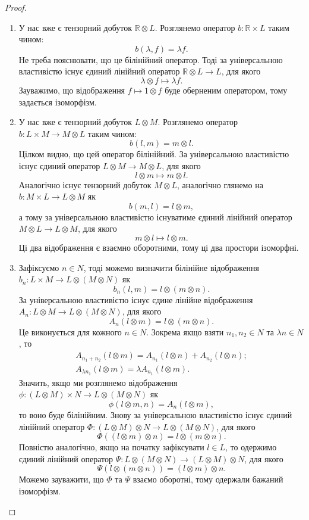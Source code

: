 \documentclass{math_library}
\begin{document}
\begin{proof}
\begin{enumerate}[topsep=0pt,label={\arabic*)},wide=0pt]
\item У нас вже є тензорний добуток $\mathbb{R} \otimes L$. Розглянемо оператор $b \colon \mathbb{R} \times L$ таким чином:
\[
b(\lambda,f) = \lambda f.
\]
Не треба пояснювати, що це білінійний оператор. Тоді за універсальною властивістю існує єдиний лінійний оператор $\mathbb{R} \otimes L \to L$, для якого
\[
\lambda \otimes f \mapsto \lambda f.
\]
Зауважимо, що відображення $f \mapsto 1 \otimes f$ буде оберненим оператором, тому задається ізоморфізм.

\item У нас вже є тензорний добуток $L \otimes M$. Розглянемо оператор $b \colon L \times M \to M \otimes L$ таким чином:
\[
b(l,m) = m \otimes l.
\]
Цілком видно, що цей оператор білінійний. За універсальною властивістю існує єдиний оператор $L \otimes M \to M \otimes L$, для якого
\[
l \otimes m \mapsto m \otimes l.
\]
Аналогічно існує тензорний добуток $M \otimes L$, аналогічно глянемо на $b \colon M \times L \to L \otimes M$ як
\[
b(m,l) = l \otimes m,
\]
а тому за універсальною властивістю існуватиме єдиний лінійний оператор $M \otimes L \to L \otimes M$, для якого
\[
m \otimes l \mapsto l \otimes m.
\]
Ці два відображення є взаємно оборотними, тому ці два простори ізоморфні.

\item Зафіксуємо $n \in N$, тоді можемо визначити білінійне відображення $b_n \colon L \times M \to L \otimes (M \otimes N)$ як
\[
b_n(l,m) = l \otimes (m \otimes n).
\]
За універсальною властивістю існує єдине лінійне відображення $A_n \colon L \otimes M \to L \otimes (M \otimes N)$, для якого
\[
A_n(l \otimes m) = l \otimes (m \otimes n).
\]
Це виконується для кожного $n \in N$. Зокрема якщо взяти $n_1,n_2 \in N$ та $\lambda n \in N$, то
\begin{align*}
A_{n_1+n_2}(l \otimes m) = A_{n_1}(l \otimes n) + A_{n_2}(l \otimes n); \\
A_{\lambda n_1}(l \otimes m) = \lambda A_{n_1}(l \otimes m).
\end{align*}
Значить, якщо ми розглянемо відображення $\phi \colon (L \otimes M) \times N \to L \otimes (M \otimes N)$ як
\[
\phi(l \otimes m, n) = A_n(l \otimes m),
\]
то воно буде білінійним. Знову за універсальною властивістю існує єдиний лінійний оператор $\Phi \colon (L \otimes M) \otimes N \to L \otimes (M \otimes N)$, для якого
\[
\Phi((l \otimes m) \otimes n) = l \otimes (m \otimes n).
\]
Повністю аналогічно, якщо на початку зафіксувати $l \in L$, то одержимо єдиний лінійний оператор $\Psi \colon L \otimes (M \otimes N) \to (L \otimes M) \otimes N$, для якого
\[
\Psi(l \otimes (m \otimes n)) = (l \otimes m) \otimes n.
\]
Можемо зауважити, що $\Phi$ та $\Psi$ взаємо оборотні, тому одержали бажаний ізоморфізм.


\end{enumerate}
\end{proof}
\end{document}

